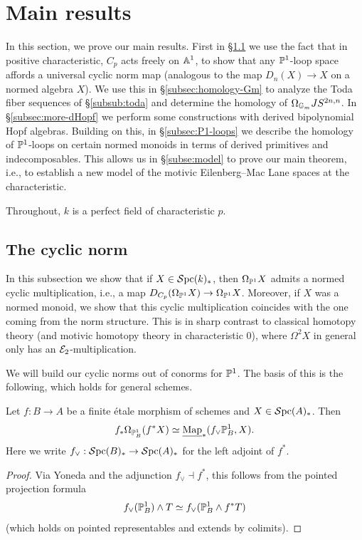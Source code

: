 \documentclass{amsart}
\numberwithin{proposition}{section}
\numberwithin{equation}{section}
\begin{document}
\section{Main results} \label{sec:main}
In this section, we prove our main results.
First in \S\ref{subsec:cyclic-norm} we use the fact that in positive characteristic, $C_p$ acts freely on $\A^1$, to show that any $\P^1$-loop space affords a universal cyclic norm map (analogous to the map $D_n(X) \to X$ on a normed algebra $X$).
We use this in \S\ref{subsec:homology-Gm} to analyze the Toda fiber sequences of \S\ref{subsub:toda} and determine the homology of $\Omega_\Gm JS^{2n,n}$.
In \S\ref{subsec:more-dHopf} we perform some constructions with derived bipolynomial Hopf algebras.
Building on this, in \S\ref{subsec:P1-loops} we describe the homology of $\P^1$-loops on certain normed monoids in terms of derived primitives and indecomposables.
This allows us in \S\ref{subse:model} to prove our main theorem, i.e., to establish a new model of the motivic Eilenberg--Mac Lane spaces at the characteristic.

Throughout, $k$ is a perfect field of characteristic $p$.

\subsection{The cyclic norm} \label{subsec:cyclic-norm}
In this subsection we show that if $X \in \Spc(k)_*$, then $\Omega_{\P^1} X$ admits a normed cyclic multiplication, i.e., a map $D_{C_p}(\Omega_{\P^1}X) \to \Omega_{\P^1}X$.
Moreover, if $X$ was a normed monoid, we show that this cyclic multiplication coincides with the one coming from the norm structure.
This is in sharp contrast to classical homotopy theory (and motivic homotopy theory in characteristic $0$), where $\Omega^2 X$ in general only has an $\scr E_2$-multiplication.

We will build our cyclic norms out of conorms for $\P^1$.
The basis of this is the following, which holds for general schemes.
\begin{lemma} \label{lemm:conorm-basis}
Let $f: B \to A$ be a finite étale morphism of schemes and $X \in \Spc(A)_*$.
Then
\[
f_*\Omega_{\P^1_B}(f^*X)
\wequi \iMap_*(f_\vee\P^1_B,X).
\]
Here we write $f_\vee:\Spc(B)_*\to\Spc(A)_*$ for the left adjoint of $f^*$.
\end{lemma}
\begin{proof}
Via Yoneda and the adjunction $f_\vee\dashv f^*$, this follows from the pointed projection formula
\[
f_\vee(\P^1_B)\wedge T
\wequi f_\vee(\P^1_B\wedge f^*T)
\]
(which holds on pointed representables and extends by colimits).
\end{proof}
\end{document}
